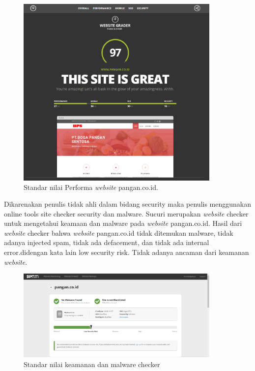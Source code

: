 \begin{figure}[htbp]
    \begin{center}
    \includegraphics[width=10cm]{img/scr-website-grader.png}
    \caption{Standar nilai Performa \emph{website} pangan.co.id.}
    \label{gambar:scr-website-grader}
    \end{center}
\end{figure}

Dikarenakan penulis tidak ahli dalam bidang security maka penulis menggunakan 
online tools site checker security dan malware. Sucuri merupakan \emph{website} checker untuk 
mengetahui keamaan dan malware pada \emph{website} pangan.co.id. Hasil dari \emph{website} checker 
bahwa \emph{website} pangan.co.id tidak ditemukan malware, tidak adanya injected spam, 
tidak ada defacement, dan tidak ada internal error.didengan kata lain low security risk. 
Tidak adanya ancaman dari keamanan \emph{website}.

\begin{figure}[htbp]
    \begin{center}
    \includegraphics[width=10cm]{img/scr-suculi.png}
    \caption{Standar nilai keamanan dan malware checker}
    \label{gambar:scr-sucuri}
    \end{center}
\end{figure}

